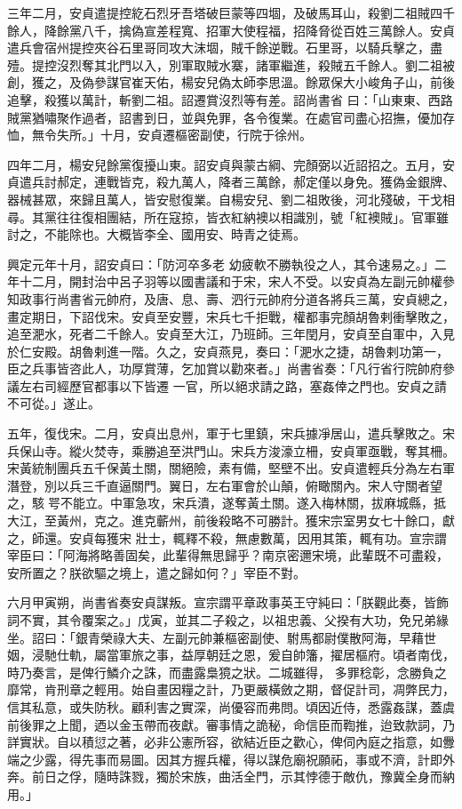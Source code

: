 \begin{pinyinscope}
 三年二月，安貞遣提控紇石烈牙吾塔破巨蒙等四堌，及破馬耳山，殺劉二祖賊四千餘人，降餘黨八千，擒偽宣差程寬、招軍大使程福，招降脅從百姓三萬餘人。安貞遣兵會宿州提控夾谷石里哥同攻大沫堌，賊千餘逆戰。石里哥，以騎兵擊之，盡殪。提控沒烈奪其北門以入，別軍取賊水寨，諸軍繼進，殺賊五千餘人。劉二祖被創，獲之，及偽參謀官崔天佑，楊安兒偽太師李思溫。餘眾保大小峻角子山，前後追擊，殺獲以萬計，斬劉二祖。詔遷賞沒烈等有差。詔尚書省
 曰：「山東東、西路賊黨猶嘯聚作過者，詔書到日，並與免罪，各令復業。在處官司盡心招撫，優加存恤，無令失所。」十月，安貞遷樞密副使，行院于徐州。



 四年二月，楊安兒餘黨復擾山東。詔安貞與蒙古綱、完顏弼以近詔招之。五月，安貞遣兵討郝定，連戰皆克，殺九萬人，降者三萬餘，郝定僅以身免。獲偽金銀牌、器械甚眾，來歸且萬人，皆安慰復業。自楊安兒、劉二祖敗後，河北殘破，干戈相尋。其黨往往復相團結，所在寇掠，皆衣紅納襖以相識別，號「紅襖賊」。官軍雖討之，不能除也。大概皆李全、國用安、時青之徒焉。



 興定元年十月，詔安貞曰：「防河卒多老
 幼疲軟不勝執役之人，其令速易之。」二年十二月，開封治中呂子羽等以國書議和于宋，宋人不受。以安貞為左副元帥權參知政事行尚書省元帥府，及唐、息、壽、泗行元帥府分道各將兵三萬，安貞總之，畫定期日，下詔伐宋。安貞至安豐，宋兵七千拒戰，權都事完顏胡魯剌衝擊敗之，追至淝水，死者二千餘人。安貞至大江，乃班師。三年閏月，安貞至自軍中，入見於仁安殿。胡魯剌進一階。久之，安貞燕見，奏曰：「淝水之捷，胡魯剌功第一，臣之兵事皆咨此人，功厚賞薄，乞加賞以勸來者。」尚書省奏：「凡行省行院帥府參議左右司經歷官都事以下皆遷
 一官，所以絕求請之路，塞姦倖之門也。安貞之請不可從。」遂止。



 五年，復伐宋。二月，安貞出息州，軍于七里鎮，宋兵據凈居山，遣兵擊敗之。宋兵保山寺。縱火焚寺，乘勝追至洪門山。宋兵方浚濠立柵，安貞軍亟戰，奪其柵。宋黃統制團兵五千保黃土關，關絕險，素有備，堅壁不出。安貞遣輕兵分為左右軍潛登，別以兵三千直逼關門。翼日，左右軍會於山顛，俯瞰關內。宋人守關者望之，駭咢不能立。中軍急攻，宋兵潰，遂奪黃土關。遂入梅林關，拔麻城縣，抵大江，至黃州，克之。進克蘄州，前後殺略不可勝計。獲宋宗室男女七十餘口，獻之，師還。安貞每獲宋
 壯士，輒釋不殺，無慮數萬，因用其策，輒有功。宣宗謂宰臣曰：「阿海將略善固矣，此輩得無思歸乎？南京密邇宋境，此輩既不可盡殺，安所置之？朕欲驅之境上，遣之歸如何？」宰臣不對。



 六月甲寅朔，尚書省奏安貞謀叛。宣宗謂平章政事英王守純曰：「朕觀此奏，皆飾詞不實，其令覆案之。」戊寅，並其二子殺之，以祖忠義、父揆有大功，免兄弟緣坐。詔曰：「銀青榮祿大夫、左副元帥兼樞密副使、駙馬都尉僕散阿海，早藉世姻，浸馳仕軌，屬當軍旅之事，益厚朝廷之恩，爰自帥籓，擢居樞府。頃者南伐，時乃奏言，是俾行鱗介之誅，而盡露梟獍之狀。二城雖得，
 多罪稔彰，念勝負之靡常，肯刑章之輕用。始自畫因糧之計，乃更嚴橫斂之期，督促計司，凋弊民力，信其私意，或失防秋。顧利害之實深，尚優容而弗問。頃因近侍，悉露姦謀，蓋虞前後罪之上聞，迺以金玉帶而夜獻。審事情之詭秘，命信臣而鞫推，迨致款詞，乃詳實狀。自以積愆之著，必非公憲所容，欲結近臣之歡心，俾伺內庭之指意，如釁端之少露，得先事而易圖。因其方握兵權，得以謀危廟祝願祏，事或不濟，計即外奔。前日之俘，隨時誅戮，獨於宋族，曲活全門，示其悖德于敵仇，豫冀全身而納用。」




\end{pinyinscope}
